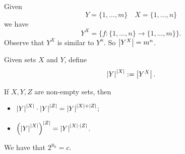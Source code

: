 \documentclass[notoc,notitlepage]{tufte-book}
\begin{document}
\begin{eg}
  Given
  \begin{equation*}
    Y = \{ 1, \ldots, m \} \quad X = \{ 1, \ldots, n \}
  \end{equation*}
  we have
  \begin{equation*}
    Y^X = \{ f : \{ 1, \ldots, n \} \to \{ 1, \ldots, m \} \}.
  \end{equation*}
  Observe that $Y^X$ is similar to $Y^n$. So $\left|Y^X\right| = m^n$.
\end{eg}

\begin{defn}\label{defn:exponentiation_of_cardinals}
  Given sets $X$ and $Y$, define
  \begin{equation*}
    \left|Y\right|^{\left|X\right|} := \left|Y^X\right|.
  \end{equation*}
\end{defn}

\begin{thm}\label{thm:exponentiation_of_cardinals}
  If $X, Y, Z$ are non-empty sets, then
  \begin{itemize}
    \item $\left|Y\right|^{\left|X\right|} \cdot \left|Y\right|^{\left|Z\right|} = \left|Y\right|^{\left|X\right| + \left|Z\right|}$;
    \item $\left( \left|Y\right|^{\left|X\right|} \right)^{\left|Z\right|} = \left|Y\right|^{\left|X\right| \cdot \left|Z\right|}$.
  \end{itemize}
\end{thm}

\begin{thm}[$2^{\aleph_0} = c$]\label{thm:2_aleph_0_c}
We have that $2^{\aleph_0} = c$.
\end{thm}
\end{document}
